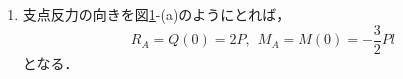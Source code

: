 \documentclass[10pt,a4j]{jarticle}
\begin{document}
\begin{enumerate}
\begin{eqnarray}
				+3
			\right\}
	\label{eqn:M2}
	\\
	Q(x) &=&
		-P
		\left\{
				H\left(\frac{x}{l} -\frac{1}{2}\right)
				+
				H\left(\frac{x}{l} -1 \right)
				-
				2
		\right\}
	\label{eqn:Q2}
\end{eqnarray}
これらを断面力図として示せば図\ref{fig:fig1}-(b)および(c)のようになる．
\begin{figure}[h]
	\begin{center}
	\texttt{[image: fig1ans.eps]} 
	\end{center}
	\vspace{-5mm}
	\caption{(a)支点反力の正方向．
	(b)せん断力図, 及び(c) 曲げモーメント図(問題1).}
	\label{fig:fig1}
\end{figure}
\item
支点反力の向きを図\ref{fig:fig1}-(a)のようにとれば，
\begin{equation}
	R_A = Q(0) =  2P, \ \  
	M_A = M(0) =  -\frac{3}{2}Pl
\end{equation}
となる．
\end{enumerate}
\end{document}
